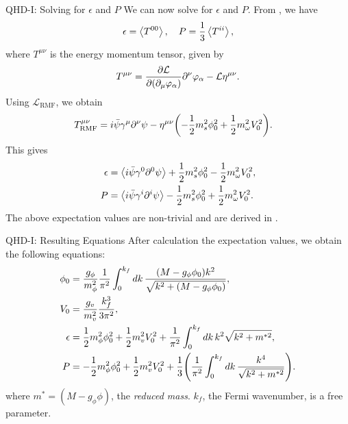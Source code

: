 \documentclass[handout]{beamer}
\newcommand{\Letter}[1]{\mathcal{#1}}
\newcommand{\Lag}{\Letter{L}}
\newcommand{\p}{\partial}
\begin{document}
    \begin{frame}{QHD-I: Solving for $\epsilon$ and $P$}
        \pause
        We can now solve for $\epsilon$ and $P$. \pause From \autocite{diener_2008}, we have
        \[\epsilon = \expval{T^{00}}, \quad P = \frac{1}{3}\expval{T^{ii}},\]
        where $T^{\mu\nu}$ is the energy momentum tensor, given by
        \vspace{-5pt}
        \begin{align*}
            T^{\mu\nu} = \pdv{\Lag}{(\p_\mu \varphi_\alpha)}\p^\nu \varphi_\alpha - \Lag \eta^{\mu\nu}.
        \end{align*} \pause
        \vspace{-5pt}
        Using $\Lag_\text{RMF}$, we obtain
        \vspace{-5pt}
        \begin{align*}
            T^{\mu\nu}_\text{RMF} & =i\bar\psi\gamma^\mu \p^\nu \psi - \eta^{\mu\nu} \pqty{- \frac{1}{2} m_s^2 \phi_0^2 + \frac{1}{2} m_\omega^2 V_0^2}.
        \end{align*} \pause
        \vspace{-5pt}
        This gives
        \vspace{-15pt}
        \begin{align*}
            \epsilon & = \expval{i\bar\psi\gamma^0 \p^0 \psi} + \frac{1}{2} m_s^2 \phi_0^2 - \frac{1}{2} m_\omega^2 V_0^2,\\
            P & = \expval{i\bar\psi\gamma^i \p^i \psi}  - \frac{1}{2} m_s^2 \phi_0^2 + \frac{1}{2} m_\omega^2 V_0^2.
        \end{align*} \pause
        The above expectation values are non-trivial and are derived in \autocite{diener_2008}.
    \end{frame}

    \begin{frame}{QHD-I: Resulting Equations}
        \pause
        After calculation the expectation values, we obtain the following equations: \pause
        \begin{align*}
            \phi_0 &= \frac{g_\phi}{m_\phi^2} \frac{1}{\pi^2} \int_0^{k_f} \dd{k} \frac{(M-g_\phi \phi_0) k^2 }{\sqrt{k^2 + (M-g_\phi \phi_0)}},  \\
            V_0 &= \frac{g_v}{m_v^2} \frac{k_f^3}{3\pi^2}, \\
            \epsilon & = \frac{1}{2} m_\phi^2 \phi_0^2 + \frac{1}{2} m_v^2 V_0^2 + \frac{1}{\pi^2} \int_0^{k_f} \dd{k} k^2 \sqrt{k^2 + m^{*2}},\\
            P & = -\frac{1}{2} m_\phi^2 \phi_0^2 + \frac{1}{2} m_v^2 V_0^2 + \frac{1}{3} \pqty{\frac{1}{\pi^2} \int_0^{k_f} \dd{k}\frac{k^4}{\sqrt{k^2 + m^{*2}}}}.
        \end{align*}
        where $m^* = (M-g_\phi \phi)$, the \textit{reduced mass}. \pause $k_f$, the Fermi wavenumber, is a free parameter. 
    \end{frame}
\end{document}
